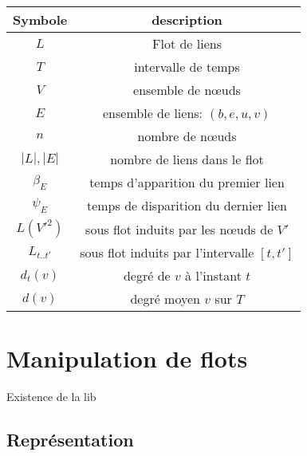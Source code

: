 \begin{center}
\begin{tabular}{|c|c|}
\hline Symbole & description \\
\hline $L$ & Flot de liens \\ 
$T$ & intervalle de temps  \\
$V$ & ensemble de n\oe uds\\
$E$ & ensemble de liens: $(b,e,u,v)$ \\
$n$ & nombre de n\oe uds  \\
$|L|,|E|$ & nombre de liens dans le flot \\
$\beta_E$ & temps d'apparition du premier lien\\
$\psi_E$ & temps de disparition du dernier lien\\
$L(V'^2)$ & sous flot induits par les n\oe uds de $V'$ \\
$L_{t..t'}$ & sous flot induits par l'intervalle $[t,t']$ \\
$d_t(v)$ & degré de $v$ à l'instant $t$\\
$d(v)$ & degré moyen $v$ sur $T$\\
\hline
\end{tabular} 
\end{center}



\section{Manipulation de flots}
Existence de la lib

\subsection{Représentation}
